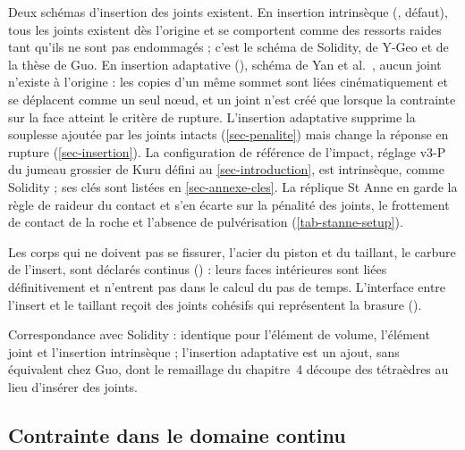 Deux schémas d'insertion des joints existent. En insertion intrinsèque (, défaut), tous les joints existent dès l'origine et se comportent comme des ressorts raides tant qu'ils ne sont pas endommagés ; c'est le schéma de Solidity, de Y-Geo et de la thèse de Guo. En insertion adaptative (), schéma de Yan et al.~\cite{yan2023adaptive}, aucun joint n'existe à l'origine : les copies d'un même sommet sont liées cinématiquement et se déplacent comme un seul nœud, et un joint n'est créé que lorsque la contrainte sur la face atteint le critère de rupture. L'insertion adaptative supprime la souplesse ajoutée par les joints intacts (\cref{sec-penalite}) mais change la réponse en rupture (\cref{sec-insertion}). La configuration de référence de l'impact, réglage v3-P du jumeau grossier de Kuru défini au \cref{sec-introduction}, est intrinsèque, comme Solidity ; ses clés sont listées en \cref{sec-annexe-cles}. La réplique St Anne en garde la règle de raideur du contact et s'en écarte sur la pénalité des joints, le frottement de contact de la roche et l'absence de pulvérisation (\cref{tab-stanne-setup}).

Les corps qui ne doivent pas se fissurer, l'acier du piston et du taillant, le carbure de l'insert, sont déclarés continus () : leurs faces intérieures sont liées définitivement et n'entrent pas dans le calcul du pas de temps. L'interface entre l'insert et le taillant reçoit des joints cohésifs qui représentent la brasure ().

Correspondance avec Solidity : identique pour l'élément de volume, l'élément joint et l'insertion intrinsèque ; l'insertion adaptative est un ajout, sans équivalent chez Guo, dont le remaillage du chapitre~4 découpe des tétraèdres au lieu d'insérer des joints.

\subsection{Contrainte dans le domaine continu}
\label{sec-continu}

